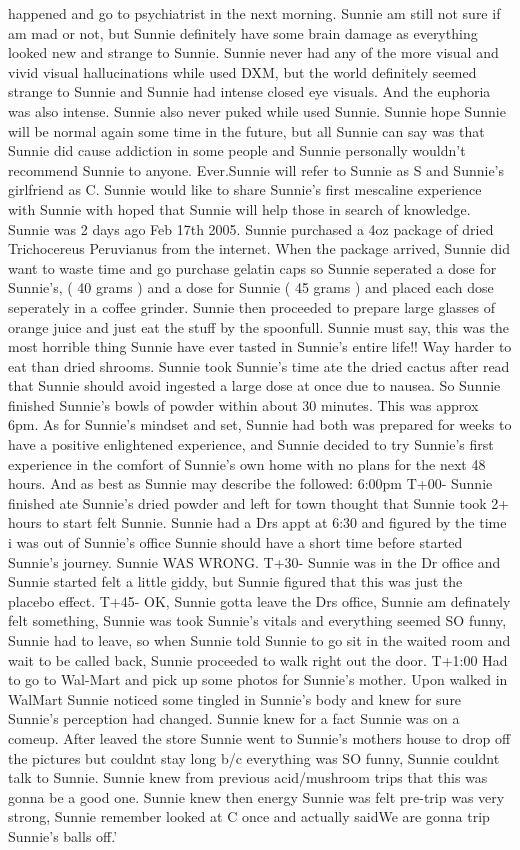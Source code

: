 \documentclass[12pt]{book}
\begin{document}
happened and go to psychiatrist in the next morning. Sunnie am still not sure if am mad or not, but Sunnie definitely have some brain damage as everything looked new and strange to Sunnie. Sunnie never had any of the more visual and vivid visual hallucinations while used DXM, but the world definitely seemed strange to Sunnie and Sunnie had intense closed eye visuals. And the euphoria was also intense. Sunnie also never puked while used Sunnie. Sunnie hope Sunnie will be normal again some time in the future, but all Sunnie can say was that Sunnie did cause addiction in some people and Sunnie personally wouldn't recommend Sunnie to anyone. Ever.Sunnie will refer to Sunnie as S and Sunnie's girlfriend as C. Sunnie would like to share Sunnie's first mescaline experience with Sunnie with hoped that Sunnie will help those in search of knowledge. Sunnie was 2 days ago Feb 17th 2005. Sunnie purchased a 4oz package of dried Trichocereus Peruvianus from the internet. When the package arrived, Sunnie did want to waste time and go purchase gelatin caps so Sunnie seperated a dose for Sunnie's, ( 40 grams ) and a dose for Sunnie ( 45 grams ) and placed each dose seperately in a coffee grinder. Sunnie then proceeded to prepare large glasses of orange juice and just eat the stuff by the spoonfull. Sunnie must say, this was the most horrible thing Sunnie have ever tasted in Sunnie's entire life!! Way harder to eat than dried shrooms. Sunnie took Sunnie's time ate the dried cactus after read that Sunnie should avoid ingested a large dose at once due to nausea. So Sunnie finished Sunnie's bowls of powder within about 30 minutes. This was approx 6pm. As for Sunnie's mindset and set, Sunnie had both was prepared for weeks to have a positive enlightened experience, and Sunnie decided to try Sunnie's first experience in the comfort of Sunnie's own home with no plans for the next 48 hours. And as best as Sunnie may describe the followed: 6:00pm T+00- Sunnie finished ate Sunnie's dried powder and left for town thought that Sunnie took 2+ hours to start felt Sunnie. Sunnie had a Drs appt at 6:30 and figured by the time i was out of Sunnie's office Sunnie should have a short time before started Sunnie's journey. Sunnie WAS WRONG. T+30- Sunnie was in the Dr office and Sunnie started felt a little giddy, but Sunnie figured that this was just the placebo effect. T+45- OK, Sunnie gotta leave the Drs office, Sunnie am definately felt something, Sunnie was took Sunnie's vitals and everything seemed SO funny, Sunnie had to leave, so when Sunnie told Sunnie to go sit in the waited room and wait to be called back, Sunnie proceeded to walk right out the door. T+1:00 Had to go to Wal-Mart and pick up some photos for Sunnie's mother. Upon walked in WalMart Sunnie noticed some tingled in Sunnie's body and knew for sure Sunnie's perception had changed. Sunnie knew for a fact Sunnie was on a comeup. After leaved the store Sunnie went to Sunnie's mothers house to drop off the pictures but couldnt stay long b/c everything was SO funny, Sunnie couldnt talk to Sunnie. Sunnie knew from previous acid/mushroom trips that this was gonna be a good one. Sunnie knew then energy Sunnie was felt pre-trip was very strong, Sunnie remember looked at C once and actually saidWe are gonna trip Sunnie's balls off.' 
\end{document}
